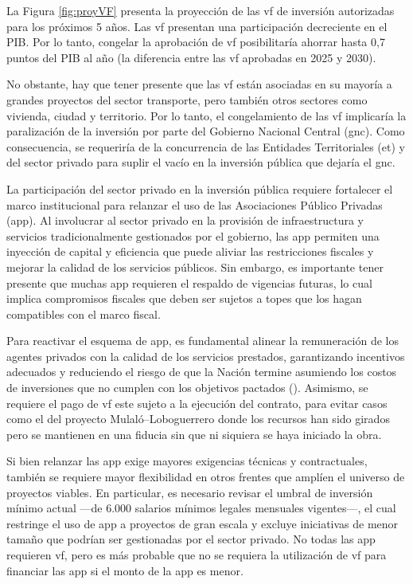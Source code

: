 

La Figura \ref{fig:proyVF} presenta la proyección de las \gls{vf} de inversión autorizadas para los próximos 5 años. Las \gls{vf} presentan una participación decreciente en el PIB.  Por lo tanto, congelar la aprobación de \gls{vf}  posibilitaría  ahorrar hasta 0,7 puntos del PIB al año (la diferencia entre las \gls{vf} aprobadas en 2025 y 2030). 

No obstante, hay que tener presente que las \gls{vf} están asociadas en su mayoría a grandes proyectos del sector transporte, pero también otros sectores como vivienda, ciudad y territorio. Por lo tanto, el congelamiento de las \gls{vf} implicaría la paralización de la inversión por parte del Gobierno Nacional Central (\gls{gnc}). Como consecuencia, se requeriría de la concurrencia de las Entidades Territoriales (\gls{et}) y del sector privado para suplir el vacío en la inversión pública que dejaría el \gls{gnc}.

La participación del sector privado en la inversión pública requiere fortalecer el marco institucional para relanzar el uso de las Asociaciones Público Privadas (\gls{app}). Al involucrar al sector privado en la provisión de infraestructura y servicios tradicionalmente gestionados por el gobierno, las \gls{app} permiten una inyección de capital y eficiencia que puede aliviar las restricciones fiscales y mejorar la calidad de los servicios públicos. Sin embargo, es importante tener presente que muchas \gls{app} requieren el respaldo de vigencias futuras, lo cual implica compromisos fiscales que deben ser sujetos a topes que los hagan compatibles con el marco fiscal.

Para reactivar el esquema de \gls{app}, es fundamental alinear la remuneración de los agentes privados con la calidad de los servicios prestados, garantizando incentivos adecuados y reduciendo el riesgo de que la Nación termine asumiendo los costos de inversiones que no cumplen con los objetivos pactados (\cite{IMF2004PPP}). Asimismo, se requiere el pago de \gls{vf} este sujeto a la ejecución del contrato, para evitar casos como el del proyecto Mulaló–Loboguerrero donde los recursos han sido girados pero se mantienen en una fiducia sin que ni siquiera se haya iniciado la obra.

Si bien relanzar las \gls{app} exige mayores exigencias técnicas y contractuales, también se requiere mayor flexibilidad en otros frentes que amplíen el universo de proyectos viables. En particular, es necesario revisar el umbral de inversión mínimo actual —de 6.000 salarios mínimos legales mensuales vigentes—, el cual restringe el uso de \gls{app} a proyectos de gran escala y excluye iniciativas de menor tamaño que podrían ser gestionadas por el sector privado. No todas las \gls{app} requieren \gls{vf}, pero es más probable que no se requiera la utilización de \gls{vf} para financiar las \gls{app} si el monto de la \gls{app} es menor.  

